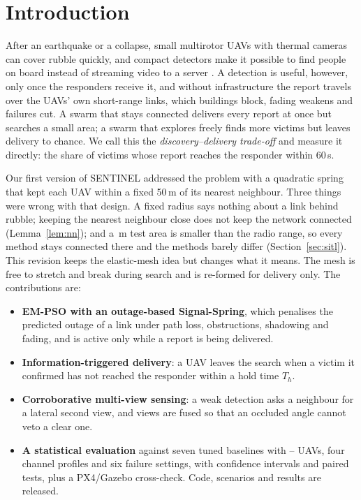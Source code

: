 \documentclass[conference]{IEEEtran}
\begin{document}
\section{Introduction}
After an earthquake or a collapse, small multirotor UAVs with thermal cameras can cover rubble
quickly, and compact detectors make it possible to find people on board instead of streaming video to
a server \cite{hituav,yolo26}. A detection is useful, however, only once the responders receive it,
and without infrastructure the report travels over the UAVs' own short-range links, which buildings
block, fading weakens and failures cut. A swarm that stays connected delivers every report at once but
searches a small area; a swarm that explores freely finds more victims but leaves delivery to chance.
We call this the \emph{discovery--delivery trade-off} and measure it directly: the share of victims
whose report reaches the responder within 60\,s.

Our first version of SENTINEL addressed the problem with a quadratic spring that kept each UAV within
a fixed 50\,m of its nearest neighbour. Three things were wrong with that design. A fixed radius says
nothing about a link behind rubble; keeping the nearest neighbour close does not keep the network
connected (Lemma~\ref{lem:nn}); and a \nNineArea\,m test area is smaller than the radio range, so every method
stays connected there and the methods barely differ (Section~\ref{sec:sitl}). This revision
keeps the elastic-mesh idea but changes what it means. The mesh is free to stretch and break during
search and is re-formed for delivery only. The contributions are:
\begin{itemize}
\item \textbf{EM-PSO with an outage-based Signal-Spring}, which penalises the predicted outage of a
link under path loss, obstructions, shadowing and fading, and is active only while a report is being
delivered.
\item \textbf{Information-triggered delivery}: a UAV leaves the search when a victim it confirmed has
not reached the responder within a hold time $T_h$.
\item \textbf{Corroborative multi-view sensing}: a weak detection asks a neighbour for a lateral second
view, and views are fused so that an occluded angle cannot veto a clear one.
\item \textbf{A statistical evaluation} against seven tuned baselines with \nEoneNmin--\nEoneNmax{} UAVs, four
channel profiles and six failure settings, with confidence intervals and paired tests, plus a PX4/Gazebo
cross-check. Code, scenarios and results are released.
\end{itemize}
\end{document}
